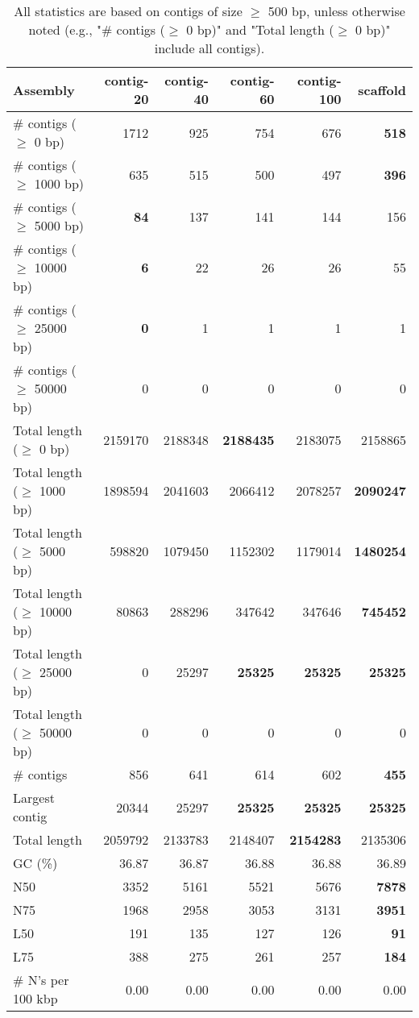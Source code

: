 \documentclass[12pt,a4paper]{article}
\begin{document}
\begin{table}[ht]
\begin{center}
\caption{All statistics are based on contigs of size $\geq$ 500 bp, unless otherwise noted (e.g., "\# contigs ($\geq$ 0 bp)" and "Total length ($\geq$ 0 bp)" include all contigs).}
\begin{tabular}{|l*{5}{|r}|}
\hline
Assembly & contig-20 & contig-40 & contig-60 & contig-100 & scaffold \\ \hline
\# contigs ($\geq$ 0 bp) & 1712 & 925 & 754 & 676 & {\bf 518} \\ \hline
\# contigs ($\geq$ 1000 bp) & 635 & 515 & 500 & 497 & {\bf 396} \\ \hline
\# contigs ($\geq$ 5000 bp) & {\bf 84} & 137 & 141 & 144 & 156 \\ \hline
\# contigs ($\geq$ 10000 bp) & {\bf 6} & 22 & 26 & 26 & 55 \\ \hline
\# contigs ($\geq$ 25000 bp) & {\bf 0} & 1 & 1 & 1 & 1 \\ \hline
\# contigs ($\geq$ 50000 bp) & 0 & 0 & 0 & 0 & 0 \\ \hline
Total length ($\geq$ 0 bp) & 2159170 & 2188348 & {\bf 2188435} & 2183075 & 2158865 \\ \hline
Total length ($\geq$ 1000 bp) & 1898594 & 2041603 & 2066412 & 2078257 & {\bf 2090247} \\ \hline
Total length ($\geq$ 5000 bp) & 598820 & 1079450 & 1152302 & 1179014 & {\bf 1480254} \\ \hline
Total length ($\geq$ 10000 bp) & 80863 & 288296 & 347642 & 347646 & {\bf 745452} \\ \hline
Total length ($\geq$ 25000 bp) & 0 & 25297 & {\bf 25325} & {\bf 25325} & {\bf 25325} \\ \hline
Total length ($\geq$ 50000 bp) & 0 & 0 & 0 & 0 & 0 \\ \hline
\# contigs & 856 & 641 & 614 & 602 & {\bf 455} \\ \hline
Largest contig & 20344 & 25297 & {\bf 25325} & {\bf 25325} & {\bf 25325} \\ \hline
Total length & 2059792 & 2133783 & 2148407 & {\bf 2154283} & 2135306 \\ \hline
GC (\%) & 36.87 & 36.87 & 36.88 & 36.88 & 36.89 \\ \hline
N50 & 3352 & 5161 & 5521 & 5676 & {\bf 7878} \\ \hline
N75 & 1968 & 2958 & 3053 & 3131 & {\bf 3951} \\ \hline
L50 & 191 & 135 & 127 & 126 & {\bf 91} \\ \hline
L75 & 388 & 275 & 261 & 257 & {\bf 184} \\ \hline
\# N's per 100 kbp & 0.00 & 0.00 & 0.00 & 0.00 & 0.00 \\ \hline
\end{tabular}
\end{center}
\end{table}
\end{document}
